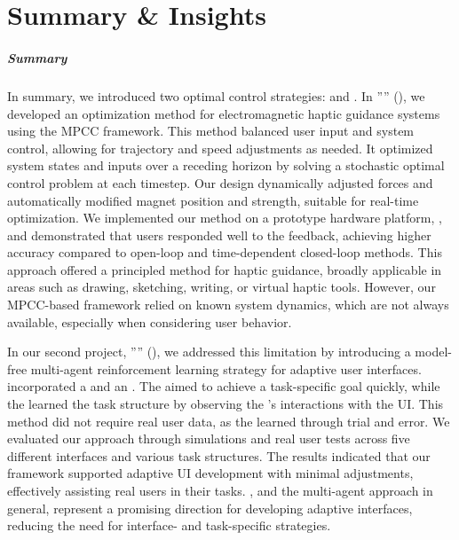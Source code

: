 \chapter{Summary \& Insights}
\label{ch:control:conclusion}

\paragraph{Summary}
In summary, we introduced two optimal control strategies: \magpen and \marlui. In ''\magpenTitle'' (), we developed an optimization method for electromagnetic haptic guidance systems using the MPCC framework. This method balanced user input and system control, allowing for trajectory and speed adjustments as needed. It optimized system states and inputs over a receding horizon by solving a stochastic optimal control problem at each timestep. Our design dynamically adjusted forces and automatically modified magnet position and strength, suitable for real-time optimization. We implemented our method on a prototype hardware platform, \magpen, and demonstrated that users responded well to the feedback, achieving higher accuracy compared to open-loop and time-dependent closed-loop methods. This approach offered a principled method for haptic guidance, broadly applicable in areas such as drawing, sketching, writing, or virtual haptic tools. However, our MPCC-based framework relied on known system dynamics, which are not always available, especially when considering user behavior.

In our second project, ''\marluiTitle'' (), we addressed this limitation by introducing a model-free multi-agent reinforcement learning strategy for adaptive user interfaces. \marlui incorporated a \useragent and an \interfaceagent. The \useragent aimed to achieve a task-specific goal quickly, while the \interfaceagent learned the task structure by observing the \useragent's interactions with the UI. This method did not require real user data, as the \useragent learned through trial and error. We evaluated our approach through simulations and real user tests across five different interfaces and various task structures. The results indicated that our framework supported adaptive UI development with minimal adjustments, effectively assisting real users in their tasks. \marlui, and the multi-agent approach in general, represent a promising direction for developing adaptive interfaces, reducing the need for interface- and task-specific strategies.

